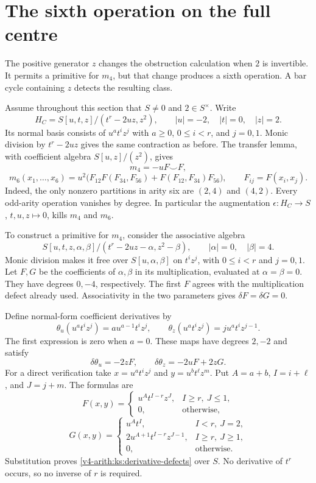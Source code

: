 \section{The sixth operation on the full centre}
\label{v4-arith:ks:sixth-operation}

The positive generator $z$ changes the obstruction calculation when $2$ is invertible.
It permits a primitive for $m_4$, but that change produces a sixth operation.
A bar cycle containing $z$ detects the resulting class.

Assume throughout this section that $S\ne0$ and $2\in S^\times$.
Write
\[
 H_C=S[u,t,z]/(t^r-2uz,z^2),\qquad |u|=-2,\quad |t|=0,\quad |z|=2.
\]
Its normal basis consists of $u^at^iz^j$ with $a\geq0$, $0\leq i<r$, and $j=0,1$.
Monic division by $t^r-2uz$ gives the same contraction as before.
The transfer lemma, with coefficient algebra $S[u,z]/(z^2)$, gives
\[
 m_4=-uF\smile F,
\]
\[
 m_6(x_1,\ldots,x_6)=u^2\bigl(
 F_{12}F(F_{34},F_{56})+F(F_{12},F_{34})F_{56}\bigr),
 \qquad F_{ij}=F(x_i,x_j).
\]
Indeed, the only nonzero partitions in arity six are $(2,4)$ and $(4,2)$.
Every odd-arity operation vanishes by degree.
In particular the augmentation
$\epsilon:H_C\to S$, $t,u,z\mapsto0$, kills $m_4$ and $m_6$.

To construct a primitive for $m_4$, consider the associative algebra
\[
 S[u,t,z,\alpha,\beta]/(t^r-2uz-\alpha,z^2-\beta),
 \qquad |\alpha|=0,\quad |\beta|=4.
\]
Monic division makes it free over $S[u,\alpha,\beta]$ on $t^iz^j$,
with $0\leq i<r$ and $j=0,1$.
Let $F,G$ be the coefficients of $\alpha,\beta$ in its multiplication,
evaluated at $\alpha=\beta=0$.
They have degrees $0,-4$, respectively.
The first $F$ agrees with the multiplication defect already used.
Associativity in the two parameters gives $\delta F=\delta G=0$.

Define normal-form coefficient derivatives by
\[
 \theta_u(u^at^iz^j)=a u^{a-1}t^iz^j,\qquad
 \theta_z(u^at^iz^j)=j u^at^iz^{j-1}.
\]
The first expression is zero when $a=0$.
These maps have degrees $2,-2$ and satisfy
\begin{equation}\label{v4-arith:ks:derivative-defects}
 \delta\theta_u=-2zF,\qquad
 \delta\theta_z=-2uF+2zG.
\end{equation}
For a direct verification take $x=u^at^iz^j$ and $y=u^bt^\ell z^m$.
Put $A=a+b$, $I=i+\ell$, and $J=j+m$.
The formulas are
\[
 F(x,y)=
 \begin{cases}
 u^At^{I-r}z^J,&I\geq r,\ J\leq1,\\
 0,&\text{otherwise},
 \end{cases}
\]
\[
 G(x,y)=
 \begin{cases}
 u^At^I,&I<r,\ J=2,\\
 2u^{A+1}t^{I-r}z^{J-1},&I\geq r,\ J\geq1,\\
 0,&\text{otherwise}.
 \end{cases}
\]
Substitution proves \eqref{v4-arith:ks:derivative-defects} over $S$.
No derivative of $t^r$ occurs, so no inverse of $r$ is required.

